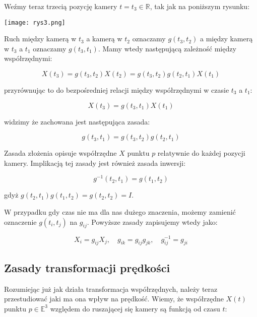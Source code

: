 \documentclass[a4paper,12pt]{article}
\newcommand{\E}{\mathbb{E}}
\newcommand{\R}{\mathbb{R}}
\begin{document}
Weźmy teraz trzecią pozycję kamery $t = t_3 \in \R$, tak jak na poniższym rysunku:

\begin{center}
\texttt{[image: rys3.png]}
\end{center}

Ruch między kamerą w $t_3$ a kamerą w $t_2$ oznaczamy $g(t_3,t_2)$ a między kamerą w $t_3$ a $t_1$ oznaczamy $g(t_3,t_1)$. Mamy wtedy następującą zależność między współrzędnymi:

\begin{equation}
X(t_3)=g(t_3,t_2)X(t_2)=g(t_3,t_2)g(t_2,t_1)X(t_1)
\end{equation}

\noindent przyrównując to do bezpośredniej relacji między współrzędnymi w czasie $t_3$ a $t_1$:

\begin{equation}
X(t_3)=g(t_3,t_1)X(t_1)
\end{equation}


\noindent widzimy że zachowana jest następująca zasada:

\begin{equation}
g(t_3,t_1) = g(t_3,t_2)g(t_2,t_1)
\end{equation}

Zasada złożenia opisuje współrzędne $X$ punktu $p$ relatywnie do każdej pozycji kamery. Implikacją tej zasady jest również zasada inwersji:

\begin{equation}
g^{-1}(t_2,t_1)=g(t_1,t_2)
\end{equation}

\noindent gdyż $g(t_2,t_1)g(t_1,t_2)=g(t_2,t_2)=I$.

W przypadku gdy czas nie ma dla nas dużego znaczenia, możemy zamienić oznaczenie $g(t_i,t_j)$ na $g_{ij}$. Powyższe zasady zapisujemy wtedy jako:

\begin{equation}
X_i=g_{ij}X_j, \quad g_{ik}=g_{ij}g_{jk}, \quad g^{-1}_{ij}=g_{ji}
\end{equation}

\subsection{Zasady transformacji prędkości}

Rozumiejąc już jak działa transformacja współrzędnych, należy teraz przestudiować jaki ma ona wpływ na prędkość. Wiemy, że współrzędne $X(t)$ punktu $p \in \E^3$ względem do ruszającej się kamery są funkcją od czasu $t$:
\end{document}
